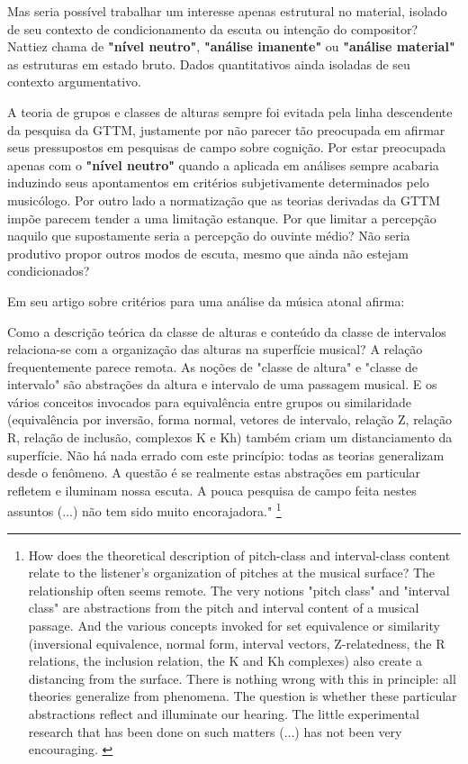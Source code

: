 \documentclass[
	12pt,				%
	openright,			%
	twoside,			%
	a4paper,			%
	english,			%
	french,				%
	spanish,			%
	brazil				%
	]{abntex2}
\begin{document}
Mas seria possível trabalhar um interesse apenas estrutural no material, isolado de seu contexto de condicionamento da escuta ou intenção do compositor? Nattiez chama de \textbf{"nível neutro"}, \textbf{"análise imanente"} ou \textbf{"análise material"} as estruturas em estado bruto. Dados quantitativos ainda isoladas de seu contexto argumentativo. 

A teoria de grupos e classes de alturas sempre foi evitada pela linha descendente da pesquisa da GTTM, justamente por não parecer tão preocupada em afirmar seus pressupostos em pesquisas de campo sobre cognição. Por estar preocupada apenas com o \textbf{"nível neutro"} quando a aplicada em análises sempre acabaria induzindo seus apontamentos em critérios subjetivamente determinados pelo musicólogo. Por outro lado a normatização que as teorias derivadas da GTTM impõe parecem tender a uma limitação estanque. Por que limitar a percepção naquilo que supostamente seria a percepção do ouvinte médio? Não seria produtivo propor outros modos de escuta, mesmo que ainda não estejam condicionados?

Em seu artigo sobre critérios para uma análise da música atonal  afirma:

\begin{citacao}
Como a descrição teórica da classe de alturas e conteúdo da classe de intervalos relaciona-se com a organização das alturas na superfície musical? A relação frequentemente parece remota. As noções de "classe de altura" e "classe de intervalo" são abstrações da altura e intervalo de uma passagem musical. E os vários conceitos invocados para equivalência entre grupos ou similaridade (equivalência por inversão, forma normal, vetores de intervalo, relação Z, relação R, relação de inclusão, complexos K e Kh) também criam um distanciamento da superfície. Não há nada errado com este princípio: todas as teorias generalizam desde o fenômeno. A questão é se realmente estas abstrações em particular refletem e iluminam nossa escuta. A pouca pesquisa de campo feita nestes assuntos (...) não tem sido muito encorajadora."\cite{lerdahl1989atonal}
\footnote{
How does the theoretical description of pitch-class and interval-class content relate to the listener's organization of pitches at the musical surface? The relationship often seems
remote. The very notions "pitch class" and "interval class" are abstractions from
the pitch and interval content of a musical passage. And the various concepts
invoked for set equivalence or similarity (inversional equivalence, normal form,
interval vectors, Z-relatedness, the R relations, the inclusion relation, the K and
Kh complexes) also create a distancing from the surface. There is nothing wrong
with this in principle: all theories generalize from phenomena. The question is
whether these particular abstractions reflect and illuminate our hearing. The little
experimental research that has been done on such matters (...) has not been very encouraging.
\cite{lerdahl1989atonal}}
\end{citacao}
\end{document}
